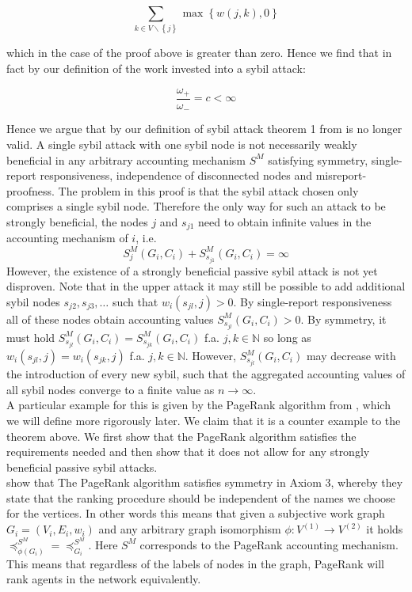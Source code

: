 \documentclass[11pt,a4paper]{report}
\theoremstyle{definition}
\theoremstyle{theorem}
\theoremstyle{proposition}
\theoremstyle{corollary}
\theoremstyle{lemma}
\theoremstyle{example}
\theoremstyle{remark}
\begin{document}
\[
\sum\limits_{k\in{}V\backslash\left\lbrace{}j\right\rbrace}\max{\left\lbrace{}w(j,k),0\right\rbrace}
\]

\noindent{}which in the case of the proof above is greater than zero. Hence we find that in fact by our definition of the work invested into a sybil attack:

\[
\frac{\omega_{+}}{\omega_{-}}=c<\infty
\]

\noindent{}Hence we argue that by our definition of sybil attack theorem 1 from \cite{On the Sybil-Proofness of Accounting Mechanisms} is no longer valid. A single sybil attack with one sybil node is not necessarily weakly beneficial in any arbitrary accounting mechanism $S^M$ satisfying symmetry, single-report responsiveness, independence of disconnected nodes and misreport-proofness. The problem in this proof is that the sybil attack chosen only comprises a single sybil node. Therefore the only way for such an attack to be strongly beneficial, the nodes $j$ and $s_{j1}$ need to obtain infinite values in the accounting mechanism of $i$, i.e. 
\[
S^M_j(G_i,C_i) + S^M_{s_{j1}}(G_i,C_i)=\infty
\]
\noindent{}However, the existence of a strongly beneficial passive sybil attack is not yet disproven. Note that in the upper attack it may still be possible to add additional sybil nodes $s_{j2},s_{j3},\ldots$ such that $w_i(s_{jl},j)>0$. By single-report responsiveness all of these nodes obtain accounting values $S^M_{s_{jl}}(G_i,C_i)>0$. By symmetry, it must hold $S^M_{s_{jl}}(G_i,C_i)=S^M_{s_{jk}}(G_i,C_i)$ f.a. $j,k\in\mathbb{N}$ so long as $w_i(s_{jl},j)=w_i(s_{jk},j)$ f.a. $j,k\in\mathbb{N}$. However, $S^M_{s_{jl}}(G_i,C_i)$ may decrease with the introduction of every new sybil, such that the aggregated accounting values of all sybil nodes converge to a finite value as $n\rightarrow\infty$. \vspace{1em}\\

\noindent{}A particular example for this is given by the PageRank algorithm from \cite{PageRank}, which we will define more rigorously later. We claim that it is a counter example to the theorem above. We first show that the PageRank algorithm satisfies the requirements needed and then show that it does not allow for any strongly beneficial passive sybil attacks. \vspace{1em}\\

\noindent{}\cite{Ranking Systems: The PageRank Axioms} show that The PageRank algorithm satisfies symmetry in Axiom 3, whereby they state that the ranking procedure should be independent of the names we choose for the vertices. In other words this means that given a subjective work graph $G_i=(V_i,E_i,w_i)$ and any arbitrary graph isomorphism $\phi:V^{(1)}\rightarrow{}V^{(2)}$ it holds $\preceq_{\phi(G_i)}^{S^M} = \preceq_{G_i}^{S^M}$. Here $S^M$ corresponds to the PageRank accounting mechanism. This means that regardless of the labels of nodes in the graph, PageRank will rank agents in the network equivalently. \vspace{1em}\\
\end{document}
